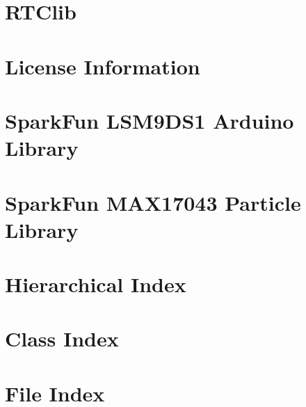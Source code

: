\documentclass[twoside]{book}
\newcommand{\+}{\discretionary{\mbox{\scriptsize$\hookleftarrow$}}{}{}}
\begin{document}
\chapter{R\+T\+Clib}
\label{md_Weather_Balloon_library_RTClib-master_README}
\hypertarget{md_Weather_Balloon_library_RTClib-master_README}{}

\chapter{License Information}
\label{md_Weather_Balloon_library_SparkFun_LSM9DS1_LICENSE}
\hypertarget{md_Weather_Balloon_library_SparkFun_LSM9DS1_LICENSE}{}

\chapter{Spark\+Fun L\+S\+M9\+D\+S1 Arduino Library}
\label{md_Weather_Balloon_library_SparkFun_LSM9DS1_README}
\hypertarget{md_Weather_Balloon_library_SparkFun_LSM9DS1_README}{}

\chapter{Spark\+Fun M\+A\+X17043 Particle Library}
\label{md_Weather_Balloon_library_SparkFun_MAX17043_README}
\hypertarget{md_Weather_Balloon_library_SparkFun_MAX17043_README}{}

\chapter{Hierarchical Index}

\chapter{Class Index}

\chapter{File Index}

\end{document}
